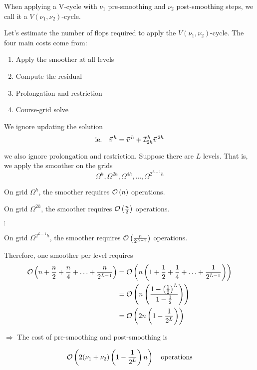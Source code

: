 When applying a V-cycle with $\nu_1$ pre-smoothing and $\nu_2$ post-smoothing
steps, we call it a $V(\nu_1, \nu_2)$-cycle.

Let's estimate the number of flops required  to apply the $V(\nu_1,
\nu_2)$-cycle. The four main costs come from:

\begin{enumerate}[1)]
\item Apply the smoother at all levels
\item Compute the residual
\item Prolongation and restriction
\item Course-grid solve
\end{enumerate}


We ignore updating the solution
\begin{equation*}
\text{ie.\quad}\vec{v}^{\,h}  = \vec{v}^{\,h} + \mathcal{I}_{2h}^{h}\vec{v}^{\,2h}
\end{equation*}

we also ignore prolongation and restriction. Suppose there are $L$ levels. That
is, we apply the smoother on the grids
\begin{equation*}
\Omega^{h},
\Omega^{2h},
\Omega^{4h},
\ldots,
\Omega^{2^{L-1}h}
\end{equation*}

On grid $\Omega^{h}$, the smoother requires $\mathcal{O}\left(n\right)$ operations. 

On grid $\Omega^{2h}$, the smoother requires $\mathcal{O}\left(\frac{n}{2}\right)$ operations. 

\hspace{4cm}$\vdots$

On grid $\Omega^{2^{L-1}h}$, the smoother requires $\mathcal{O}\left(\frac{n}{2^{L-1}}\right)$ operations. 

Therefore, one smoother per level requires
\begin{align*}
  \mathcal{O}\left(n+\frac{n}{2} + \frac{n}{4} + \ldots + \frac{n}{2^{L-1}}\right)
  &= \mathcal{O}\left(n\left(1+\frac{1}{2} + \frac{1}{4} + \ldots + \frac{1}{2^{L-1}}\right)\right)\\
  &=\mathcal{O}\left(n \left( \frac{1-\left( \frac{1}{2}\right)^L}{1-\frac{1}{2}} \right) \right)\\
  &= \mathcal{O}\left(2n \left( 1-\frac{1}{2^L}\right)\right)
\end{align*}

$\Rightarrow$ The cost of pre-smoothing and post-smoothing is

\begin{align*}
\mathcal{O}\left(2(\nu_1+\nu_2) \left( 1-\frac{1}{2^L} \right)n \right) \quad \text{operations}
\end{align*}


